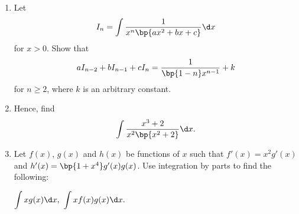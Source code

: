 \clearpage
\begin{problem}
    \begin{enumerate}
        \item Let \[I_n = \int \frac1{x^n \bp{ax^2 + bx + c}} \d x\] for $x > 0$. Show that \[aI_{n-2} + bI_{n-1} + cI_n = \frac1{\bp{1-n} x^{n-1}} + k\] for $n \geq 2$, where $k$ is an arbitrary constant.
        \item Hence, find \[\int \frac{x^3 + 2}{x^2 \bp{x^2 + 2}} \d x.\]
        \item Let $f(x)$, $g(x)$ and $h(x)$ be functions of $x$ such that $f'(x) = x^2 g'(x)$ and $h'(x) = \bp{1 + x^4} g'(x) g(x)$. Use integration by parts to find the following:
        \begin{tasks}
            \task $\displaystyle\int xg(x) \d x,$
            \task $\displaystyle\int xf(x)g(x) \d x.$
        \end{tasks}
    \end{enumerate}
\end{problem}
